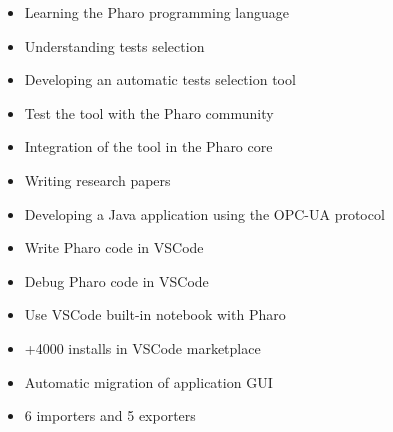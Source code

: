 \documentclass[10pt,a4paper,ragged2e,withhyper]{altacv}
\begin{document}
\divider


\begin{itemize}
  \item Learning the Pharo programming language
  \item Understanding tests selection
  \item Developing an automatic tests selection tool
  \item Test the tool with the Pharo community
  \item Integration of the tool in the Pharo core
  \item Writing research papers
\end{itemize}

\divider


\begin{itemize}
  \item Developing a Java application using the OPC-UA protocol
\end{itemize}



\begin{itemize}
  \item Write Pharo code in VSCode
  \item Debug Pharo code in VSCode
  \item Use VSCode built-in notebook with Pharo
  \item +4000 installs in VSCode marketplace
\end{itemize}

\divider



\begin{itemize}
  \item Automatic migration of application GUI
  \item 6 importers and 5 exporters
\end{itemize}


\divider

\end{document}
